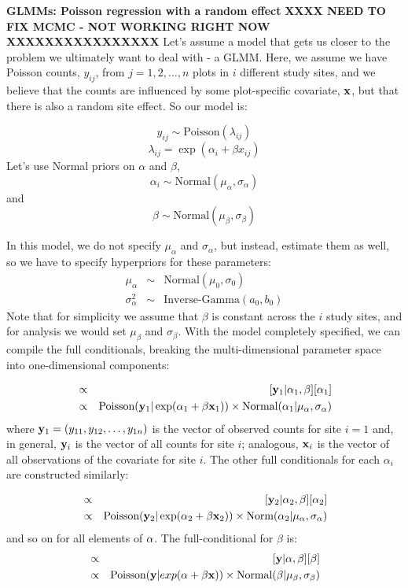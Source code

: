 {\flushleft \bf  GLMMs: Poisson regression with a random effect }
{\bf XXXX NEED TO FIX MCMC - NOT WORKING RIGHT NOW XXXXXXXXXXXXXXXX} 
Let's assume a model that gets us closer to the problem we ultimately
want to deal with - a GLMM. Here, we assume we have Poisson counts,
$y_{ij}$, from $j=1,2,\ldots,n$ plots in $i$ different study sites,
and we believe that the counts are influenced by some plot-specific
covariate, ${\bf x}$, but that there is also a random site effect. So
our model is:
 
\[
y_{ij} \sim \mbox{Poisson}(\lambda_{ij})
\]
\[
\lambda_{ij} = \exp (\alpha_i + \beta x_{ij})
\]
Let's use Normal priors on $\alpha$ and $\beta$,  \[
\alpha_i \sim \mbox{Normal} (\mu_{\alpha}, \sigma_{\alpha})
\]
and
\[
\beta \sim \mbox{Normal} (\mu_{\beta}, \sigma_{\beta})
\]

In this model, we do not specify $\mu_{\alpha}$ and $\sigma_{\alpha}$, but instead, estimate them as well, so we have
to specify hyperpriors for these parameters:
\begin{eqnarray*}
\mu_{\alpha}  &\sim &  \mbox{Normal}(\mu_0, \sigma_0)  \\
\sigma_{\alpha}^2 & \sim & \mbox{Inverse-Gamma}(a_0, b_0)
\end{eqnarray*}
Note that for simplicity we assume that $\beta$ is constant across the $i$ study sites, and for analysis we would set $\mu_{\beta}$ and $\sigma_{\beta}$.
With the model completely specified, we can compile the full conditionals,
breaking the multi-dimensional parameter space into one-dimensional
components:

\begin{eqnarray*}
[\alpha_1|\alpha_2,\alpha_3,\ldots,\alpha_i,\beta,{\bf y}_{1}] & \propto &   [{\bf y}_{1}|\alpha_1,\beta]  [\alpha_1] \\
	 & \propto  &   \mbox{Poisson}({\bf y}_{1}| \exp(\alpha_1 + \beta {\bf x}_1)) \times \mbox{Normal}(\alpha_1|\mu_{\alpha} , \sigma_{\alpha})
\end{eqnarray*}
where ${\bf y}_{1} = (y_{11},y_{12}, \ldots, y_{1n})$ is the vector of
observed counts for site $i=1$ and, in general, ${\bf y}_{i}$ is the
vector of all counts for site $i$; analogous, ${\bf x}_{i}$ is the
vector of all observations of the covariate for site $i$. The other full conditionals for
each $\alpha_{i}$ are constructed similarly:

\begin{eqnarray*}
[\alpha_2|\alpha_1,\alpha_3,\ldots,\alpha_i,\beta,{\bf y}_{2}] & \propto&  [{\bf y}_{2}|\alpha_2,\beta]  [\alpha_2] \\
	 & \propto  & \mbox{Poisson}({\bf y}_{2}| \exp(\alpha_2 + \beta {\bf x}_2)) \times \mbox{Norm}(\alpha_2|\mu_{\alpha}, \sigma_{\alpha})
\end{eqnarray*}
and so on for all elements of ${\bf \alpha}$. The full-conditional for $\beta$ is:
\begin{eqnarray*}
[\beta|{\bf \alpha},{\bf y}] &\propto & [{\bf y}|{\bf \alpha},\beta]  [\beta] \\
	 &\propto& \mbox{Poisson}({\bf y}|exp({\bf \alpha} + \beta {\bf x})) \times \mbox{Normal}(\beta|\mu_{\beta}, \sigma_{\beta})
\end{eqnarray*}

